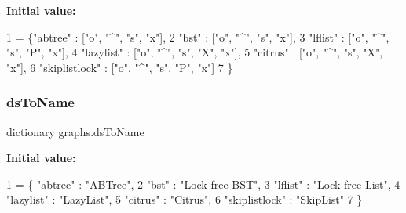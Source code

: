 {\bfseries Initial value\+:}
\begin{DoxyCode}
1 =  \{\textcolor{stringliteral}{"abtree"} :        [\textcolor{stringliteral}{"o"}, \textcolor{stringliteral}{"^"}, \textcolor{stringliteral}{"s"}, \textcolor{stringliteral}{"x"}],
2              \textcolor{stringliteral}{"bst"} :            [\textcolor{stringliteral}{"o"}, \textcolor{stringliteral}{"^"}, \textcolor{stringliteral}{"s"}, \textcolor{stringliteral}{"x"}],
3              \textcolor{stringliteral}{"lflist"} :         [\textcolor{stringliteral}{"o"}, \textcolor{stringliteral}{"^"}, \textcolor{stringliteral}{"s"}, \textcolor{stringliteral}{"P"}, \textcolor{stringliteral}{"x"}],
4              \textcolor{stringliteral}{"lazylist"} :       [\textcolor{stringliteral}{"o"}, \textcolor{stringliteral}{"^"}, \textcolor{stringliteral}{"s"}, \textcolor{stringliteral}{"X"}, \textcolor{stringliteral}{"x"}],
5              \textcolor{stringliteral}{"citrus"} :         [\textcolor{stringliteral}{"o"}, \textcolor{stringliteral}{"^"}, \textcolor{stringliteral}{"s"}, \textcolor{stringliteral}{"X"}, \textcolor{stringliteral}{"x"}],
6              \textcolor{stringliteral}{"skiplistlock"} :   [\textcolor{stringliteral}{"o"}, \textcolor{stringliteral}{"^"}, \textcolor{stringliteral}{"s"}, \textcolor{stringliteral}{"P"}, \textcolor{stringliteral}{"x"}]
7             \}
\end{DoxyCode}
\mbox{\label{namespacegraphs_a6af2e3b2f1a3b79bd2a458bbf83a7ff7}} 
\subsubsection{\texorpdfstring{ds\+To\+Name}{dsToName}}
{\footnotesize\ttfamily dictionary graphs.\+ds\+To\+Name}

{\bfseries Initial value\+:}
\begin{DoxyCode}
1 =  \{ \textcolor{stringliteral}{"abtree"} :         \textcolor{stringliteral}{"ABTree"},
2              \textcolor{stringliteral}{"bst"} :            \textcolor{stringliteral}{"Lock-free BST"},
3              \textcolor{stringliteral}{"lflist"} :         \textcolor{stringliteral}{"Lock-free List"},
4              \textcolor{stringliteral}{"lazylist"} :       \textcolor{stringliteral}{"LazyList"},
5              \textcolor{stringliteral}{"citrus"} :         \textcolor{stringliteral}{"Citrus"},
6              \textcolor{stringliteral}{"skiplistlock"} :   \textcolor{stringliteral}{"SkipList"}
7             \}
\end{DoxyCode}
\mbox{\label{namespacegraphs_a6ce3a98ae1dbb9201958249357fd9ac6}} 
